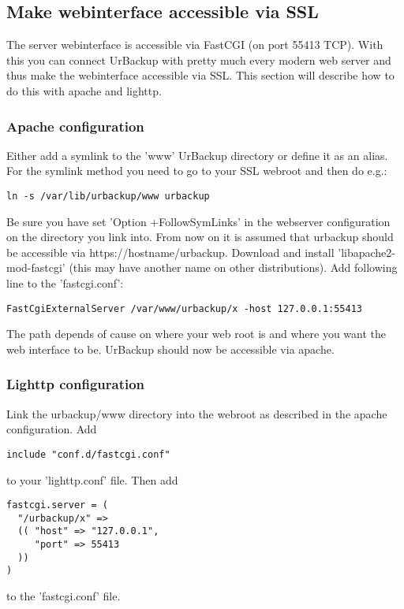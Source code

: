 \documentclass[a4paper,10pt]{article}
\begin{document}
\subsection{Make webinterface accessible via SSL}
\label{sec_webinterface_ssl}

The server webinterface is accessible via FastCGI (on port 55413 TCP). With this you can connect UrBackup with pretty much every modern web server and thus make the webinterface accessible via SSL. This section will describe how to do this with apache and lighttp.

\subsubsection{Apache configuration}
\label{subsub_apache}

Either add a symlink to the 'www' UrBackup directory or define it as an alias. For the symlink method you need to go to your SSL webroot and then do e.g.:
\begin{verbatim}
ln -s /var/lib/urbackup/www urbackup
\end{verbatim}
Be sure you have set 'Option +FollowSymLinks' in the webserver configuration on the directory you link into. From now on it is assumed that urbackup should be accessible via https://hostname/urbackup.
Download and install 'libapache2-mod-fastcgi' (this may have another name on other distributions). Add following line to the 'fastcgi.conf':
\begin{verbatim}
FastCgiExternalServer /var/www/urbackup/x -host 127.0.0.1:55413
\end{verbatim}
The path depends of cause on where your web root is and where you want the web interface to be. UrBackup should now be accessible via apache.

\subsubsection{Lighttp configuration}

Link the urbackup/www directory into the webroot as described in the apache configuration.
Add
\begin{verbatim}
include "conf.d/fastcgi.conf"
\end{verbatim}
to your 'lighttp.conf' file. Then add 
\begin{verbatim}
fastcgi.server = (
  "/urbackup/x" =>
  (( "host" => "127.0.0.1",
     "port" => 55413
  ))
)
\end{verbatim}
to the 'fastcgi.conf' file.
\end{document}
